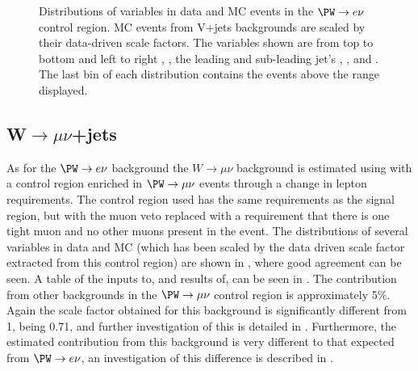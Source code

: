 \begin{figure}
  \caption{Distributions of variables in data and \ac{MC} events in the $\PW\rightarrow e\nu$ control region. \ac{MC} events from V+jets backgrounds are scaled by their data-driven scale factors. The variables shown are from top to bottom and left to right \detajj, \Mjj, the leading and sub-leading jet's \pt, \METnoMU, \METsig and \jetmetdphi. The last bin of each distribution contains the events above the range displayed.}
  \label{fig:parkedwenu}
\end{figure}

\subsection{W$\rightarrow \mu\nu$+jets}
\label{sec:parkedwmunu}
As for the $\PW\rightarrow e\nu$ background the $W\rightarrow \mu\nu$ background is estimated using  with a control region enriched in $\PW\rightarrow\mu\nu$ events through a change in lepton requirements. The control region used has the same requirements as the signal region, but with the muon veto replaced with a requirement that there is one tight muon and no other muons present in the event. The distributions of several variables in data and \ac{MC} (which has been scaled by the data driven scale factor extracted from this control region) are shown in , where good agreement can be seen. A table of the inputs to, and results of,  can be seen in . The contribution from other backgrounds in the $\PW\rightarrow\mu\nu$ control region is approximately 5\%. Again the scale factor obtained  for this background is significantly different from 1, being 0.71, and further investigation of this is detailed in . Furthermore, the estimated contribution from this background is very different to that expected from $\PW\rightarrow e\nu$, an investigation of this difference is described in .

